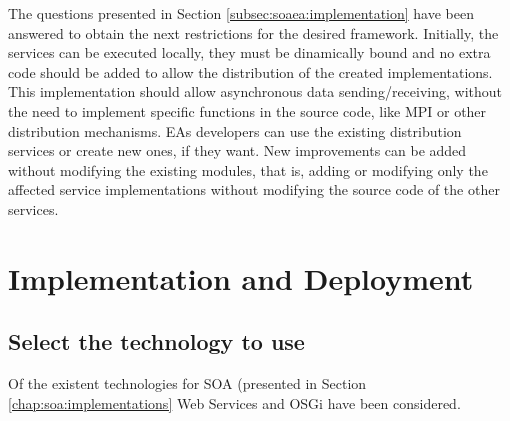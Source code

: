 The questions presented in Section \ref{subsec:soaea:implementation} have been answered to obtain the next restrictions for the desired framework. Initially, the services can be executed locally, they must be dinamically bound and no extra code should be added to allow the distribution of the created implementations. This implementation should allow asynchronous data sending/receiving, without the need to implement
  specific functions in the source code, like MPI or other
  distribution mechanisms. EAs developers can use the existing
  distribution services or create new ones, if they want. New improvements can be added
  without modifying the existing modules, that is, adding or modifying
  only the affected service implementations without modifying the
  source code of the other services.

\section{Implementation and Deployment}

\subsection{Select the technology to use}
\label{sec:osgiliath:technology}

Of the existent technologies for SOA (presented in Section \ref{chap:soa:implementations} Web Services and OSGi have been considered.


